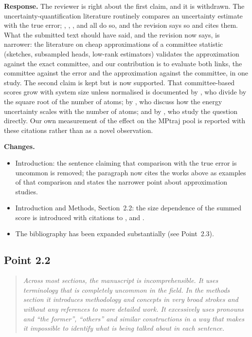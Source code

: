 \documentclass[11pt]{article}
\newcommand{\rpoint}[1]{\begin{quote}\itshape #1\end{quote}}
\newcommand{\response}{\medskip\noindent\textbf{Response.} }
\newcommand{\changes}{\medskip\noindent\textbf{Changes.}}
\begin{document}
\response
The reviewer is right about the first claim, and it is withdrawn. The
uncertainty-quantification literature routinely compares an uncertainty
estimate with the true error; \citet{kahle2022quality}, \citet{tan2023single},
\citet{busk2021calibrated}, \citet{kellner2024shallow} and
\citet{beck2025committee} all do so, and the revision says so and cites them.
What the submitted text should have said, and the revision now says, is
narrower: the literature on cheap approximations of a committee statistic
(sketches, subsampled heads, low-rank estimators) validates the approximation
against the exact committee, and our contribution is to evaluate both links,
the committee against the error and the approximation against the committee,
in one study. The second claim is kept but is now supported. That
committee-based scores grow with system size unless normalised is documented
by \citet{smith2018less}, who divide by the square root of the number of
atoms; by \citet{kellner2024shallow}, who discuss how the energy uncertainty
scales with the number of atoms; and by \citet{lortaraprasert2026size}, who
study the question directly. Our own measurement of the effect on the MPtraj
pool is reported with these citations rather than as a novel observation.

\changes
\begin{itemize}
\item Introduction: the sentence claiming that comparison with the true error
  is uncommon is removed; the paragraph now cites the works above as
  examples of that comparison and states the narrower point about
  approximation studies.
\item Introduction and Methods, Section~2.2: the size dependence of the
  summed score is introduced with citations to \citet{smith2018less},
  \citet{kellner2024shallow} and \citet{lortaraprasert2026size}.
\item The bibliography has been expanded substantially (see Point~2.3).
\end{itemize}

\subsection*{Point 2.2}
\rpoint{Across most sections, the manuscript is incomprehensible. It uses
terminology that is completely uncommon in the field. In the methods section
it introduces methodology and concepts in very broad strokes and without any
references to more detailed work. It excessively uses pronouns and ``the
former'', ``others'' and similar constructions in a way that makes it
impossible to identify what is being talked about in each sentence.}
\end{document}
